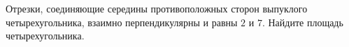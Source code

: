 \begin{ex}
	\begin{condition}
		Отрезки, соединяющие середины противоположных сторон выпуклого четырехугольника, взаимно перпендикулярны и равны \( 2  \) и \( 7 \). Найдите площадь четырехугольника.
	\end{condition}
\end{ex}